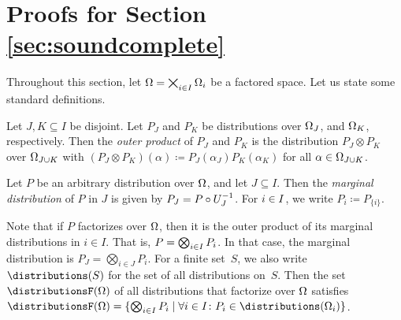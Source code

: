 \documentclass[USenglish,onecolumn]{article}
\begin{document}
\section{Proofs for Section \ref{sec:soundcomplete}} %
\label{app:soundcompleteproof}

Throughout this section, let $\Omega=\bigtimes_{i\in I}\Omega_i$ be a factored space. Let us state some standard definitions.
%
\begin{definition}\label{def:outer-product} Let $J,K\subseteq I$ be disjoint. Let $P_J$ and $P_K$ be distributions over $\Omega_J$, and $\Omega_K$, respectively. Then the \emph{outer product} of $P_J$ and $P_K$ is the distribution $P_J\otimes P_K$ over $\Omega_{J\cup K}$ with $(P_J\otimes P_K)(\alpha)\coloneq P_J(\alpha_J)P_K(\alpha_K)$ for all $\alpha\in\Omega_{J\cup K}$.
\end{definition}
\begin{definition}\label{def:marginal}
Let $P$ be an arbitrary distribution over $\Omega$, and let $J\subseteq I$.
Then the \emph{marginal distribution} of $P$ in $J$ is given by $P_J = P \circ U_J^{-1}$.
For ${i\in I}$, we write $P_i\coloneq P_{\{i\}}$.
\end{definition}

Note that if $P$ factorizes over $\Omega$, then it is the outer product of its marginal distributions in $i\in I$. That is, $P=\bigotimes_{i\in I} P_i$. In that case, the marginal distribution is $P_J=\bigotimes_{i\in J}P_i$.
For a finite set~$S$, we also write $\distributions(S)$ for the set of all distributions on~$S$.
Then the set $\distributionsF(\Omg)$ of all distributions that factorize over $\Omega$ satisfies $\distributionsF(\Omg)= \{\bigotimes_\iinI  P_i \mid \forall i\in I\colon P_i \in \distributions(\Omg_i)\}$.
\end{document}
